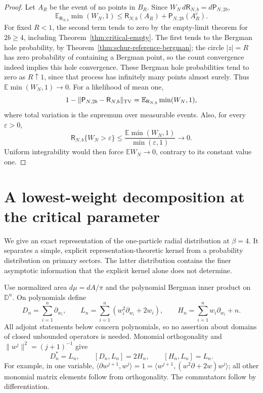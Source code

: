 \documentclass[11pt,a4paper]{article}
\numberwithin{equation}{section}
\theoremstyle{definition}
\theoremstyle{remark}
\begin{document}
\begin{proof}
Let $A_R$ be the event of no points in $B_R$. Since
$W_N\,d\mathsf R_{N,b}=d\mathsf P_{N,2b}$,
\[
 \mathbb E_{\mathsf R_{N,b}}\min(W_N,1)
 \le\mathsf R_{N,b}(A_R)+\mathsf P_{N,2b}(A_R^c).
\]
For fixed $R<1$, the second term tends to zero by the empty-limit
 theorem for $2b\ge4$, including Theorem~\ref{thm:critical-empty}. The first tends to the Bergman hole probability,
by Theorem~\ref{thm:schur-reference-bergman}; the circle $|z|=R$
has zero probability of containing a Bergman point, so the count
convergence indeed implies this hole convergence. These Bergman
hole probabilities tend to zero as $R\uparrow1$, since that process
has infinitely many points almost surely. Thus
$\mathbb E\min(W_N,1)\to0$. For a likelihood of mean one,
\[
 1-\|\mathsf P_{N,2b}-\mathsf R_{N,b}\|_{\rm TV}
 =\mathbb E_{\mathsf R_{N,b}}\min(W_N,1),
\]
where total variation is the supremum over measurable events.
Also, for every $\varepsilon>0$,
\[
 \mathsf R_{N,b}\{W_N>\varepsilon\}
 \le\frac{\mathbb E\min(W_N,1)}{\min(\varepsilon,1)}\longrightarrow0.
\]
Uniform integrability would then force $\mathbb E W_N\to0$, contrary
to its constant value one.
\end{proof}


\section{A lowest-weight decomposition at the critical parameter}
\label{sec:critical-su11-sectors}

We give an exact representation of the one-particle radial distribution
at $\beta=4$. It separates a simple, explicit representation-theoretic
kernel from a probability distribution on primary sectors. The latter
distribution contains the finer asymptotic information that the explicit
kernel alone does not determine.

Use normalized area $d\mu=dA/\pi$ and the polynomial Bergman inner
product on $\mathbb D^n$. On polynomials define
\[
 D_n=\sum_{i=1}^n\partial_{w_i},\qquad
 L_n=\sum_{i=1}^n(w_i^2\partial_{w_i}+2w_i),\qquad
 H_n=\sum_{i=1}^n w_i\partial_{w_i}+n.
\]
All adjoint statements below concern polynomials, so no assertion about
domains of closed unbounded operators is needed. Monomial orthogonality
and $\|w^j\|^2=(j+1)^{-1}$ give
\begin{equation}
 D_n^*=L_n,\qquad [D_n,L_n]=2H_n,\qquad [H_n,L_n]=L_n.
 \label{eq:critical-su11-operators}
\end{equation}
For example, in one variable,
$\langle\partial w^{j+1},w^j\rangle=1
=\langle w^{j+1},(w^2\partial+2w)w^j\rangle$;
all other monomial matrix elements follow from orthogonality.
The commutators follow by differentiation.
\end{document}
